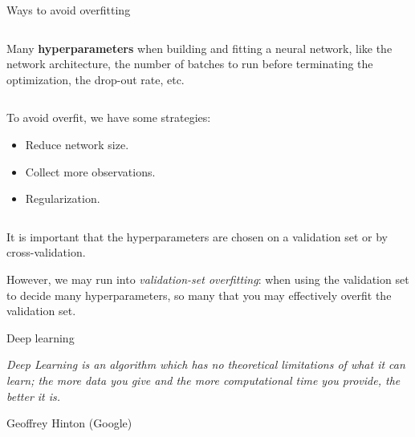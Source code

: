 \documentclass[10pt,ignorenonframetext,]{beamer}
\begin{document}
\begin{frame}

\begin{block}{Ways to avoid overfitting}

\(~\)

Many \textbf{hyperparameters} when building and fitting a neural
network, like the network architecture, the number of batches to run
before terminating the optimization, the drop-out rate, etc.

\(~\)

To avoid overfit, we have some strategies:

\vspace{2mm}

\begin{itemize}
\item
  Reduce network size. \vspace{2mm}
\item
  Collect more observations. \vspace{2mm}
\item
  Regularization.
\end{itemize}

\(~\)

It is important that the hyperparameters are chosen on a validation set
or by cross-validation.

\vspace{2mm}

However, we may run into \emph{validation-set overfitting}: when using
the validation set to decide many hyperparameters, so many that you may
effectively overfit the validation set.

\end{block}

\end{frame}

\begin{frame}{Deep learning}
\protect\hypertarget{deep-learning-1}{}

\emph{Deep Learning is an algorithm which has no theoretical limitations
of what it can learn; the more data you give and the more computational
time you provide, the better it is.}

Geoffrey Hinton (Google)

\end{frame}
\end{document}
